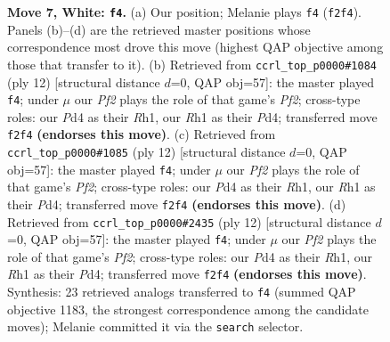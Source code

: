 \documentclass[11pt]{article}
\begin{document}
\begin{figure}[p]
\caption{\textbf{Move 7, White: \texttt{f4}.} (a) Our position; Melanie plays \texttt{f4} (\texttt{f2f4}). Panels (b)--(d) are the retrieved master positions whose correspondence most drove this move (highest QAP objective among those that transfer to it). (b) Retrieved from \texttt{ccrl\_top\_p0000\#1084} (ply 12) [structural distance $d$=0, QAP obj=57]: the master played \texttt{f4}; under $\mu$ our \emph{Pf2} plays the role of that game's \emph{Pf2}; cross-type roles: our \emph{P}d4 as their \emph{R}h1, our \emph{R}h1 as their \emph{P}d4; transferred move \texttt{f2f4} \textbf{(endorses this move)}. (c) Retrieved from \texttt{ccrl\_top\_p0000\#1085} (ply 12) [structural distance $d$=0, QAP obj=57]: the master played \texttt{f4}; under $\mu$ our \emph{Pf2} plays the role of that game's \emph{Pf2}; cross-type roles: our \emph{P}d4 as their \emph{R}h1, our \emph{R}h1 as their \emph{P}d4; transferred move \texttt{f2f4} \textbf{(endorses this move)}. (d) Retrieved from \texttt{ccrl\_top\_p0000\#2435} (ply 12) [structural distance $d$=0, QAP obj=57]: the master played \texttt{f4}; under $\mu$ our \emph{Pf2} plays the role of that game's \emph{Pf2}; cross-type roles: our \emph{P}d4 as their \emph{R}h1, our \emph{R}h1 as their \emph{P}d4; transferred move \texttt{f2f4} \textbf{(endorses this move)}. Synthesis: 23 retrieved analogs transferred to \texttt{f4} (summed QAP objective 1183, the strongest correspondence among the candidate moves); Melanie committed it via the \texttt{search} selector.}
\label{fig:thought-m12}
\end{figure}

\clearpage
\end{document}
